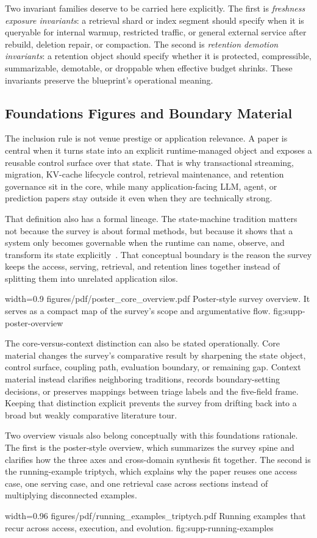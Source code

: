 Two invariant families deserve to be carried here explicitly. The first is \emph{freshness exposure invariants}: a retrieval shard or index segment should specify when it is queryable for internal warmup, restricted traffic, or general external service after rebuild, deletion repair, or compaction. The second is \emph{retention demotion invariants}: a retention object should specify whether it is protected, compressible, summarizable, demotable, or droppable when effective budget shrinks. These invariants preserve the blueprint's operational meaning.

\subsection{Foundations Figures and Boundary Material}

The inclusion rule is not venue prestige or application relevance. A paper is central when it turns state into an explicit runtime-managed object and exposes a reusable control surface over that state. That is why transactional streaming, migration, KV-cache lifecycle control, retrieval maintenance, and retention governance sit in the core, while many application-facing LLM, agent, or prediction papers stay outside it even when they are technically strong.

That definition also has a formal lineage. The state-machine tradition matters not because the survey is about formal methods, but because it shows that a system only becomes governable when the runtime can name, observe, and transform its state explicitly~\cite{schneider1990state}. That conceptual boundary is the reason the survey keeps the access, serving, retrieval, and retention lines together instead of splitting them into unrelated application silos.

\inlinefigurewithcaption
  {width=0.9\linewidth}
  {figures/pdf/poster_core_overview.pdf}
  {Poster-style survey overview. It serves as a compact map of the survey's scope and argumentative flow.}
  {fig:supp-poster-overview}

The core-versus-context distinction can also be stated operationally. Core material changes the survey's comparative result by sharpening the state object, control surface, coupling path, evaluation boundary, or remaining gap. Context material instead clarifies neighboring traditions, records boundary-setting decisions, or preserves mappings between triage labels and the five-field frame. Keeping that distinction explicit prevents the survey from drifting back into a broad but weakly comparative literature tour.

Two overview visuals also belong conceptually with this foundations rationale. The first is the poster-style overview, which summarizes the survey spine and clarifies how the three axes and cross-domain synthesis fit together. The second is the running-example triptych, which explains why the paper reuses one access case, one serving case, and one retrieval case across sections instead of multiplying disconnected examples.

\inlinefigurewithcaption
  {width=0.96\linewidth}
  {figures/pdf/running_examples_triptych.pdf}
  {Running examples that recur across access, execution, and evolution.}
  {fig:supp-running-examples}
